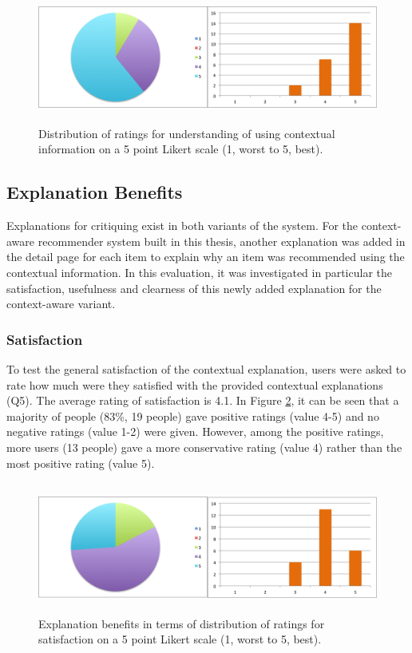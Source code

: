 \begin{figure}[H]
	\centering
	\includegraphics[height=1.7in]{figures/contextBenefits.png}
	\caption{Distribution of ratings for understanding of using contextual information on a 5 point Likert scale (1, worst to 5, best).}
	\label{fig:contextBenefits}
\end{figure}

\subsection{Explanation Benefits} \label{sec:results_eb}

Explanations for critiquing exist in both variants of the system. For the context-aware recommender system built in this thesis, another explanation was added in the detail page for each item to explain why an item was recommended using the contextual information. In this evaluation, it was investigated in particular the satisfaction, usefulness and clearness of this newly added explanation for the context-aware variant.

\subsubsection{Satisfaction} \label{sec:results_eb_s}

To test the general satisfaction of the contextual explanation, users were asked to rate how much were they satisfied with the provided contextual explanations (Q5). The average rating of satisfaction is 4.1. In Figure \ref{fig:satisfaction}, it can be seen that a majority of people (83\%, 19 people) gave positive ratings (value 4-5) and no negative ratings (value 1-2) were given. However, among the positive ratings, more users (13 people) gave a more conservative rating (value 4) rather than the most positive rating (value 5).

\begin{figure}[H]
	\centering
	\includegraphics[height=1.7in]{figures/satisfaction.png}
	\caption{Explanation benefits in terms of distribution of ratings for satisfaction on a 5 point Likert scale (1, worst to 5, best).}
	\label{fig:satisfaction}
\end{figure}

